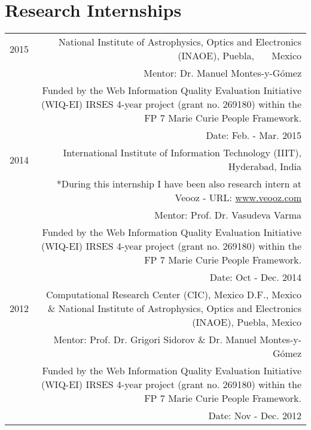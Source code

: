 \documentclass[10pt]{article}
\begin{document}
\section*{Research Internships}
\begin{tabular}{L!{\VRule}R}
	2015&National Institute of Astrophysics, Optics and Electronics (INAOE), Puebla, ~~~Mexico\\
	&\scriptsize{Mentor: Dr. Manuel Montes-y-G{\'o}mez}\\          
	&\scriptsize{Funded by the  Web Information Quality Evaluation Initiative (WIQ-EI) IRSES 4-year project (grant no. 269180) within the FP 7 Marie Curie People Framework.}\\
	&\scriptsize{Date: Feb. - Mar. 2015}\vspace{5pt}\\
	2014&International Institute of Information Technology (IIIT), Hyderabad, India\\
	&\scriptsize{*During this internship I have been also research intern at Veooz - URL: \url{www.veooz.com} }\\
	&\scriptsize{Mentor: Prof. Dr. Vasudeva Varma}\\          
	&\scriptsize{Funded by the  Web Information Quality Evaluation Initiative (WIQ-EI) IRSES 4-year project (grant no. 269180) within the FP 7 Marie Curie People Framework.}\\
	&\scriptsize{Date: Oct - Dec. 2014}\vspace{5pt}\\
	2012&Computational Research Center (CIC), Mexico D.F., Mexico \& National Institute of Astrophysics, Optics and Electronics (INAOE), Puebla, Mexico\\
	&\scriptsize{Mentor: Prof. Dr. Grigori Sidorov \& Dr. Manuel Montes-y-G{\'o}mez}\\         
	&\scriptsize{Funded by the  Web Information Quality Evaluation Initiative (WIQ-EI) IRSES 4-year project (grant no. 269180) within the FP 7 Marie Curie People Framework.}\\
	&\scriptsize{Date: Nov - Dec. 2012}\vspace{5pt}\\
\end{tabular}
\end{document}
